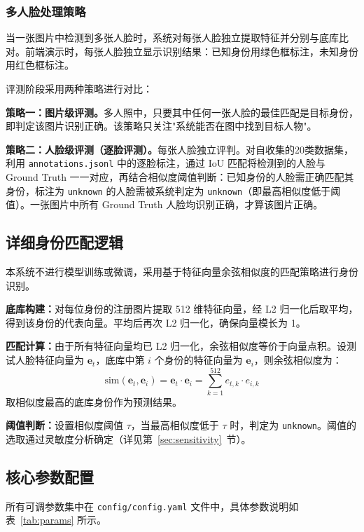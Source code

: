 \documentclass[12pt, a4paper]{article}
\begin{document}
\subsubsection{多人脸处理策略}

当一张图片中检测到多张人脸时，系统对每张人脸独立提取特征并分别与底库比对。前端演示时，每张人脸独立显示识别结果：已知身份用绿色框标注，未知身份用红色框标注。

评测阶段采用两种策略进行对比：

\textbf{策略一：图片级评测。}多人照中，只要其中任何一张人脸的最佳匹配是目标身份，即判定该图片识别正确。该策略只关注"系统能否在图中找到目标人物"。

\textbf{策略二：人脸级评测（逐脸评测）。}每张人脸独立评判。对自收集的20类数据集，利用 \texttt{annotations.jsonl} 中的逐脸标注，通过 IoU 匹配将检测到的人脸与 Ground Truth 一一对应，再结合相似度阈值判断：已知身份的人脸需正确匹配其身份，标注为 \texttt{unknown} 的人脸需被系统判定为 \texttt{unknown}（即最高相似度低于阈值）。一张图片中所有 Ground Truth 人脸均识别正确，才算该图片正确。

\subsection{详细身份匹配逻辑}

本系统不进行模型训练或微调，采用基于特征向量余弦相似度的匹配策略进行身份识别。

\textbf{底库构建：}对每位身份的注册图片提取 512 维特征向量，经 L2 归一化后取平均，得到该身份的代表向量。平均后再次 L2 归一化，确保向量模长为 1。

\textbf{匹配计算：}由于所有特征向量均已 L2 归一化，余弦相似度等价于向量点积。设测试人脸特征向量为 $\mathbf{e}_t$，底库中第 $i$ 个身份的特征向量为 $\mathbf{e}_i$，则余弦相似度为：
\begin{equation}
  \text{sim}(\mathbf{e}_t, \mathbf{e}_i) = \mathbf{e}_t \cdot \mathbf{e}_i = \sum_{k=1}^{512} e_{t,k} \cdot e_{i,k}
  \label{eq:cosine-sim}
\end{equation}
取相似度最高的底库身份作为预测结果。

\textbf{阈值判断：}设置相似度阈值 $\tau$，当最高相似度低于 $\tau$ 时，判定为 \texttt{unknown}。阈值的选取通过灵敏度分析确定（详见第~\ref{sec:sensitivity}~节）。

\subsection{核心参数配置}

所有可调参数集中在 \texttt{config/config.yaml} 文件中，具体参数说明如表~\ref{tab:params} 所示。
\end{document}
